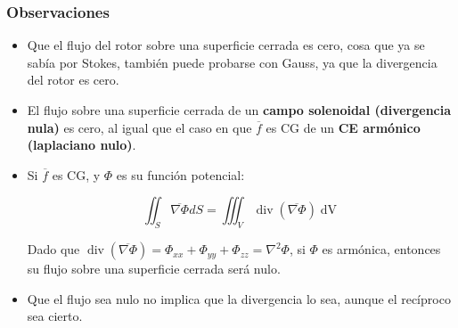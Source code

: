 \documentclass{article}
\begin{document}
\subsubsection{Observaciones}

\begin{itemize}
\item Que el flujo del rotor sobre una superficie cerrada es cero, cosa que ya se sabía por Stokes, también puede probarse con Gauss, ya que la divergencia del rotor es cero.

\item El flujo sobre una superficie cerrada de un \textbf{campo solenoidal (divergencia nula)} es cero, al igual que el caso en que $\overline{f}$ es CG de un \textbf{CE armónico (laplaciano nulo)}. 

\item Si $\overline{f}$ es CG, y $\Phi$ es su función potencial:

\begin{equation}
\iint_S \overline{\nabla \Phi} dS = \iiint_V \mathop{div}( \overline{\nabla \Phi} ) \mathop{dV}
\end{equation}

Dado que $\mathop{div}( \overline{\nabla \Phi} ) = \Phi_{xx} + \Phi_{yy} + \Phi_{zz} = \nabla^2 \Phi$, si $\Phi$ es armónica, entonces su flujo sobre una superficie cerrada será nulo.

\item Que el flujo sea nulo no implica que la divergencia lo sea, aunque el recíproco sea cierto.

\end{itemize}
\end{document}
